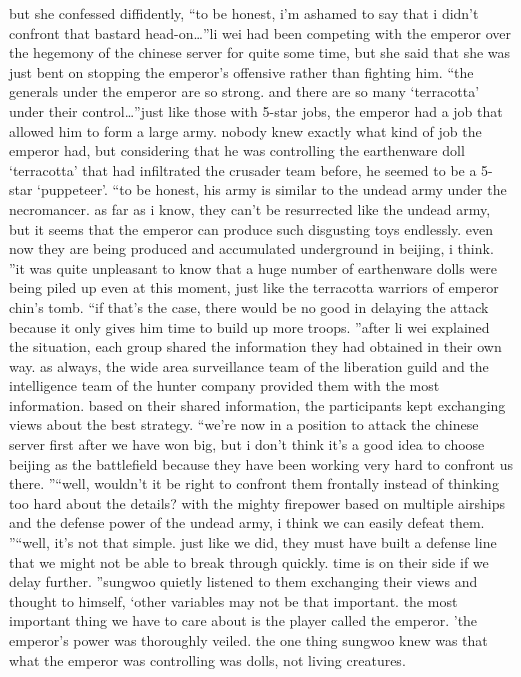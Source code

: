 but she confessed diffidently, “to be honest, i’m ashamed to say that i didn’t confront that bastard head-on…”li wei had been competing with the emperor over the hegemony of the chinese server for quite some time, but she said that she was just bent on stopping the emperor’s offensive rather than fighting him.
“the generals under the emperor are so strong.
 and there are so many ‘terracotta’ under their control…”just like those with 5-star jobs, the emperor had a job that allowed him to form a large army.
nobody knew exactly what kind of job the emperor had, but considering that he was controlling the earthenware doll ‘terracotta’ that had infiltrated the crusader team before, he seemed to be a 5-star ‘puppeteer’.
“to be honest, his army is similar to the undead army under the necromancer.
 as far as i know, they can’t be resurrected like the undead army, but it seems that the emperor can produce such disgusting toys endlessly.
 even now they are being produced and accumulated underground in beijing, i think.
”it was quite unpleasant to know that a huge number of earthenware dolls were being piled up even at this moment, just like the terracotta warriors of emperor chin’s tomb.
“if that’s the case, there would be no good in delaying the attack because it only gives him time to build up more troops.
”after li wei explained the situation, each group shared the information they had obtained in their own way.
 as always, the wide area surveillance team of the liberation guild and the intelligence team of the hunter company provided them with the most information.
based on their shared information, the participants kept exchanging views about the best strategy.
“we’re now in a position to attack the chinese server first after we have won big, but i don’t think it’s a good idea to choose beijing as the battlefield because they have been working very hard to confront us there.
”“well, wouldn’t it be right to confront them frontally instead of thinking too hard about the details? with the mighty firepower based on multiple airships and the defense power of the undead army, i think we can easily defeat them.
”“well, it’s not that simple.
 just like we did, they must have built a defense line that we might not be able to break through quickly.
 time is on their side if we delay further.
”sungwoo quietly listened to them exchanging their views and thought to himself, ‘other variables may not be that important.
 the most important thing we have to care about is the player called the emperor.
’the emperor’s power was thoroughly veiled.
 the one thing sungwoo knew was that what the emperor was controlling was dolls, not living creatures.
